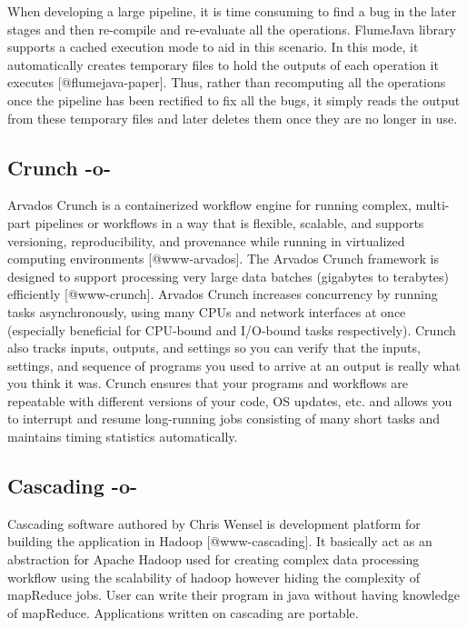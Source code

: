 When developing a large pipeline, it is time consuming to find a bug
in the later stages and then re-compile and re-evaluate all the
operations. FlumeJava library supports a cached execution mode to aid
in this scenario. In this mode, it automatically creates temporary
files to hold the outputs of each operation it
executes [@flumejava-paper]. Thus, rather than recomputing all the
operations once the pipeline has been rectified to fix all the bugs,
it simply reads the output from these temporary files and later
deletes them once they are no longer in use.



\subsection{Crunch -o-}

Arvados Crunch is a containerized workflow engine for running complex,
multi-part pipelines or workflows in a way that is flexible, scalable,
and supports versioning, reproducibility, and provenance while running
in virtualized computing environments [@www-arvados]. The Arvados
Crunch framework is designed to support processing very large data
batches (gigabytes to terabytes)
efficiently [@www-crunch]. Arvados Crunch increases concurrency by
running tasks asynchronously, using many CPUs and network interfaces
at once (especially beneficial for CPU-bound and I/O-bound tasks
respectively). Crunch also tracks inputs, outputs, and settings so you
can verify that the inputs, settings, and sequence of programs you
used to arrive at an output is really what you think it was. Crunch
ensures that your programs and workflows are repeatable with different
versions of your code, OS updates, etc. and allows you to interrupt
and resume long-running jobs consisting of many short tasks and
maintains timing statistics automatically.



\subsection{Cascading -o-}

Cascading software authored by Chris Wensel is development platform
for building the application in Hadoop [@www-cascading].  It
basically act as an abstraction for Apache Hadoop used for creating
complex data processing workflow using the scalability of hadoop
however hiding the complexity of mapReduce jobs.  User can write their
program in java without having knowledge of mapReduce. Applications
written on cascading are portable.
 
